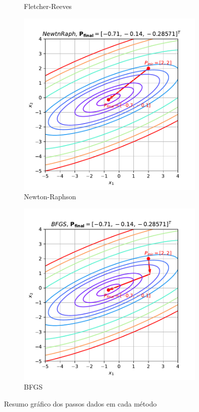 \documentclass[10pt, a4paper]{article}
\begin{document}
\begin{figure}[htpb]
\begin{subfigure}[b]{0.32\textwidth}
    \caption{Fletcher-Reeves}
    \label{fig:q1_fletchrvs}
  \end{subfigure}
  \hfill
  \begin{subfigure}[b]{0.32\textwidth}
    \centering
    \includegraphics[width=\textwidth]{images/q1_NewtnRaph.pdf}
    \caption{Newton-Raphson}
    \label{fig:q1_newtnraph}
  \end{subfigure}
  \hfill
  \begin{subfigure}[b]{0.32\textwidth}
    \centering
    \includegraphics[width=\textwidth]{images/q1_BFGS.pdf}
    \caption{BFGS}
    \label{fig:q1_bfgs}
  \end{subfigure}
     \caption{Resumo gráfico dos passos dados em cada método}
     \label{fig:q1_2}
\end{figure}




\end{document}
